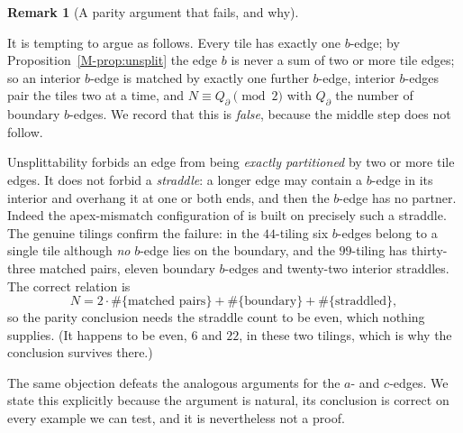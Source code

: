 \documentclass[11pt,reqno]{amsart}
\theoremstyle{plain}
\theoremstyle{definition}
\newtheorem{remark}[theorem]{Remark}
\begin{document}
\begin{remark}[A parity argument that fails, and why]\label{OM-parityfail}

It is tempting to argue as follows. Every tile has exactly one $b$-edge; by
Proposition~\ref{M-prop:unsplit} the edge $b$ is never a sum of two or more tile edges; so an interior
$b$-edge is matched by exactly one further $b$-edge, interior $b$-edges pair the tiles two at a time,
and $N\equiv Q_\partial\pmod2$ with $Q_\partial$ the number of boundary $b$-edges. We record that this
is \emph{false}, because the middle step does not follow.

Unsplittability forbids an edge from being \emph{exactly partitioned} by two or more tile edges. It
does not forbid a \emph{straddle}: a longer edge may contain a $b$-edge in its interior and overhang
it at one or both ends, and then the $b$-edge has no partner. Indeed the apex-mismatch configuration
of \cite{Companion} is built on precisely such a straddle. The genuine tilings confirm the
failure: in the $44$-tiling six $b$-edges belong to a single tile although \emph{no} $b$-edge lies on
the boundary, and the $99$-tiling has thirty-three matched pairs, eleven boundary $b$-edges and
twenty-two interior straddles. The correct relation is
\[
N=2\cdot\#\{\text{matched pairs}\}+\#\{\text{boundary}\}+\#\{\text{straddled}\},
\]
so the parity conclusion needs the straddle count to be even, which nothing supplies. (It happens to
be even, $6$ and $22$, in these two tilings, which is why the conclusion survives there.)

The same objection defeats the analogous arguments for the $a$- and $c$-edges. We state this
explicitly because the argument is natural, its conclusion is correct on every example we can test,
and it is nevertheless not a proof.
\end{remark}
\end{document}
